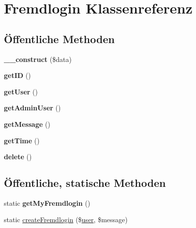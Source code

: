 \hypertarget{class_fremdlogin}{}\section{Fremdlogin Klassenreferenz}
\label{class_fremdlogin}
\subsection*{Öffentliche Methoden}
\begin{DoxyCompactItemize}
\item 
\mbox{\label{class_fremdlogin_aec698186c6d16af88ce51dfdaacdf154}} 
{\bfseries \+\_\+\+\_\+construct} (\$data)
\item 
\mbox{\label{class_fremdlogin_ab54799c14db3b150af22c3d9d040e436}} 
{\bfseries get\+ID} ()
\item 
\mbox{\label{class_fremdlogin_a381000fa49377476f4199fd6a22a4971}} 
{\bfseries get\+User} ()
\item 
\mbox{\label{class_fremdlogin_aa3d5107911b88d54dfb8104c11caa24f}} 
{\bfseries get\+Admin\+User} ()
\item 
\mbox{\label{class_fremdlogin_a5d89a22ea225afb9cfc370ed803f8724}} 
{\bfseries get\+Message} ()
\item 
\mbox{\label{class_fremdlogin_abe99873cbf3b1ca5144d08415e94eeb1}} 
{\bfseries get\+Time} ()
\item 
\mbox{\label{class_fremdlogin_a68ca14e1d6cd9d5d931428223980650d}} 
{\bfseries delete} ()
\end{DoxyCompactItemize}
\subsection*{Öffentliche, statische Methoden}
\begin{DoxyCompactItemize}
\item 
\mbox{\label{class_fremdlogin_a0cf66fad56030f70bffb104b11c5feb1}} 
static {\bfseries get\+My\+Fremdlogin} ()
\item 
static \mbox{\hyperlink{class_fremdlogin_a79c6f8347c2c617d8974331d0fb72c5b}{create\+Fremdlogin}} (\$\mbox{\hyperlink{classuser}{user}}, \$message)
\end{DoxyCompactItemize}


